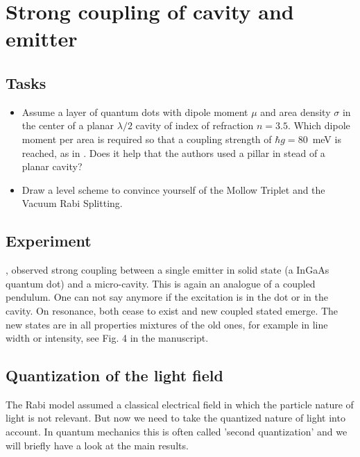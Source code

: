 \renewcommand{\lastmod}{May 7, 2020}


\chapter{Strong coupling of cavity and emitter}




\section{Tasks}

\begin{itemize}
\item Assume a layer of quantum dots with dipole moment $\mu$ and area density $\sigma$ in the center of a planar $\lambda/2$ cavity of index of refraction $n=3.5$. Which dipole moment per area is required so that a coupling strength of $\hbar g = 80$~meV is reached, as in \cite{Reithmaier04}. Does it help that the authors used a pillar in stead of a planar cavity?

\item Draw a level scheme to convince yourself of the Mollow Triplet and the Vacuum Rabi Splitting.
\end{itemize}



\section{Experiment}

\cite{Reithmaier04}, observed strong coupling between a single emitter in solid state (a InGaAs quantum dot) and a micro-cavity. This is again an analogue of a coupled pendulum. One can not say anymore if the excitation is in the dot or in the cavity. On resonance, both cease to exist and new coupled stated emerge. The new states are in all properties mixtures of the old ones, for example in line width or intensity, see Fig. 4 in the manuscript.

\section{Quantization of the light field}
The Rabi model assumed a classical electrical field in which the particle nature of light is not relevant. But now we need to take the quantized nature of light into account. In quantum mechanics this is often called 'second quantization' and we will briefly have a look at the main results.

